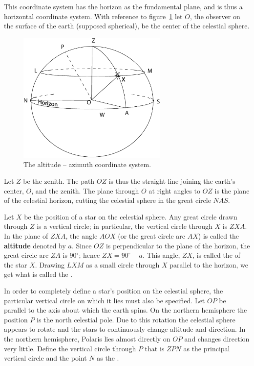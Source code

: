 This coordinate system has the horizon as the fundamental plane, and is thus a horizontal
coordinate system.
With reference to figure~\ref{fig:alt-az} let $O$, the observer on
the surface of the earth (supposed spherical), be the center of the
celestial sphere. 
%
\begin{figure}[htpb]
\centering
\includegraphics[width=0.66\textwidth]{alt-az.eps}
\caption{The altitude -- azimuth coordinate system.}
\label{fig:alt-az}
\end{figure}
%
Let $Z$ be the zenith.
The path $OZ$ is thus the straight line joining
the earth's center, $O$, and the zenith. The plane through $O$ at right angles to
$OZ$ is the plane of the celestial horizon,
cutting the celestial sphere in the
great circle $NAS$.

Let $X$ be the position of a star on the celestial sphere. Any great
circle drawn through $Z$ is a vertical circle; in
particular, the vertical circle through $X$ is $ZXA$. In the plane of
$ZXA$, the angle $AOX$ (or the great circle arc $AX$) is called the
{\bf altitude} denoted by $a$. Since $OZ$ is perpendicular to the plane of
the horizon, the great circle arc $ZA$ is 90$^\circ$; hence
$ZX=90^\circ-a$. This angle, $ZX$, is called the {} of the star
$X$. Drawing $LXM$ as a small circle through $X$ parallel to the
horizon, we get what is called the {}. 

In order to completely define a star's position on the celestial sphere, the
particular vertical circle on which it lies must also be
specified. Let $OP$ be parallel to the axis about which the earth
spins. On the northern hemisphere the position $P$ is the
north celestial pole. Due to this rotation the celestial sphere
appears to rotate and the stars to continuously change altitude and
direction. In the northern hemisphere, Polaris lies almost directly on
$OP$ and changes direction very little. Define the vertical circle
through $P$ that is $ZPN$ as the principal vertical circle and the
point $N$ as the {}.

